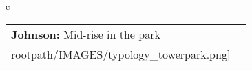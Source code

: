\begin{table}[H]
        \begin{tabular}{c}
        \begin{tabular}{m{1.5in} m{2in}}
\textbf{Johnson:} {Mid-rise in the park} & \texttt{[image: \\rootpath/IMAGES/typology\_towerpark.png]}
\end{tabular}\end{tabular}
        \end{table}